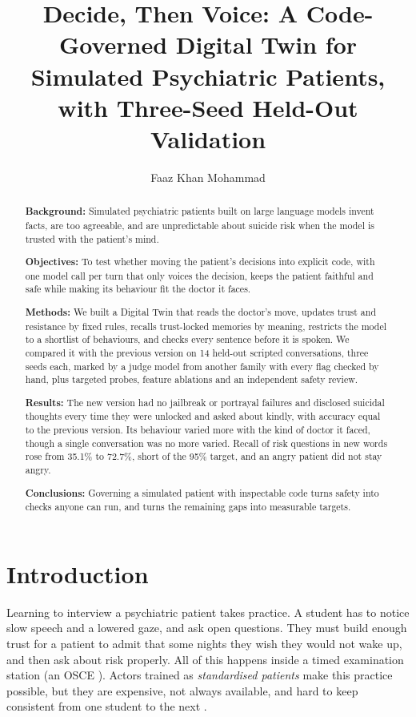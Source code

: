 \documentclass[manuscript, screen, review]{jair}
\begin{document}
\title{Decide, Then Voice: A Code-Governed Digital Twin for Simulated Psychiatric Patients, with Three-Seed Held-Out Validation}
\author{Faaz Khan Mohammad}
\renewcommand{\shortauthors}{Mohammad}
\begin{abstract}
{\bf Background:} Simulated psychiatric patients built on large language models invent facts, are too agreeable, and are unpredictable about suicide risk when the model is trusted with the patient's mind.

{\bf Objectives:} To test whether moving the patient's decisions into explicit code, with one model call per turn that only voices the decision, keeps the patient faithful and safe while making its behaviour fit the doctor it faces.

{\bf Methods:} We built a Digital Twin that reads the doctor's move, updates trust and resistance by fixed rules, recalls trust-locked memories by meaning, restricts the model to a shortlist of behaviours, and checks every sentence before it is spoken. We compared it with the previous version on 14 held-out scripted conversations, three seeds each, marked by a judge model from another family with every flag checked by hand, plus targeted probes, feature ablations and an independent safety review.

{\bf Results:} The new version had no jailbreak or portrayal failures and disclosed suicidal thoughts every time they were unlocked and asked about kindly, with accuracy equal to the previous version. Its behaviour varied more with the kind of doctor it faced, though a single conversation was no more varied. Recall of risk questions in new words rose from 35.1\% to 72.7\%, short of the 95\% target, and an angry patient did not stay angry.

{\bf Conclusions:} Governing a simulated patient with inspectable code turns safety into checks anyone can run, and turns the remaining gaps into measurable targets.
\end{abstract}
\maketitle

\section{Introduction}
Learning to interview a psychiatric patient takes practice. A student has to notice slow speech and a lowered gaze, and ask open questions. They must build enough trust for a patient to admit that some nights they wish they would not wake up, and then ask about risk properly. All of this happens inside a timed examination station (an OSCE \citep{harden1975osce}). Actors trained as \emph{standardised patients} make this practice possible, but
they are expensive, not always available, and hard to keep consistent from one student to the next \citep{piot2021simulation}.
\end{document}
